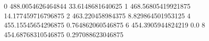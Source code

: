 0 488.0054626464844 33.6148681640625
1 468.56805419921875 14.177459716796875
2 463.220458984375 8.829864501953125
4 455.15545654296875 0.764862060546875
6 454.3905944824219 0.0
8 454.68768310546875 0.297088623046875
